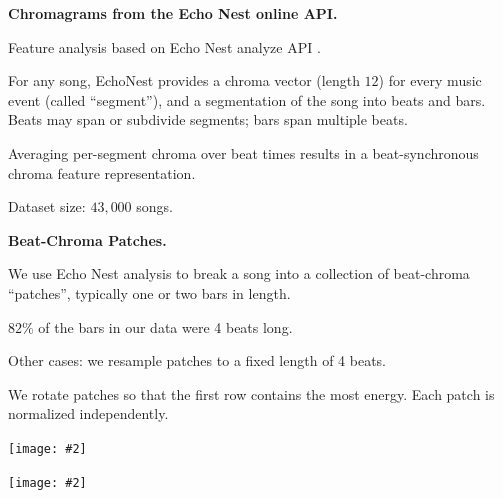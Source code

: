 \documentclass[portrait,a0b,final]{a0poster}
\newenvironment{poster}{
  \begin{center}
  \begin{minipage}[c]{0.98\textwidth}
}{
  \end{minipage} 
  \end{center}
}
\newcommand{\pbox}[4]{
\psshadowbox[#3]{
\begin{minipage}[t][#2][t]{#1}
#4
\end{minipage}
}}
\newcommand{\myfig}[3][0]{
\begin{center}
  \vspace{1.5cm}
  \texttt{[image: \#2]}
  \nobreak\medskip
\end{center}}
\newcommand{\mycaption}[1]{
  \vspace{0.5cm}
  \begin{quote}
    {{\sc Figure} \arabic{figure}: #1}
  \end{quote}
  \vspace{1cm}
  \stepcounter{figure}
}
\begin{document}
\begin{poster}
\begin{multicols}{3}
\vspace{1.0cm}

\textbf{Chromagrams from the Echo Nest online API.}
\begin{list}{}{\leftmargin=2em =1em}
\item Feature analysis based on Echo Nest analyze API \cite{EchoNest}.
\item For any song, EchoNest provides a chroma
vector (length $12$) for every music event (called ``segment''), and a
segmentation of the song into beats and bars. Beats may span or 
subdivide segments; bars span multiple beats.
\item Averaging per-segment chroma over beat times results in a
beat-synchronous chroma feature representation.
\item Dataset size: $43,000$ songs.
\end{list}

\textbf{Beat-Chroma Patches.}
\begin{list}{}{\leftmargin=2em =1em}
\item We use Echo Nest analysis to break a song into a collection of 
beat-chroma ``patches'', typically one or two bars in length.
\item $82\%$ of the bars in our data were 4 beats long.
\item Other cases: we resample patches to a fixed length of 4 beats.
\item We rotate patches so that the first row contains the most energy.
Each patch is normalized independently.
\end{list}



\myfig[0]{song_encoded.ps}{.9}

\myfig[0]{codes_8bars.ps}{.8}

\newpage


\vspace{2cm}
\begin{center}
  \pbox{0.8\columnwidth}{}{linewidth=2mm,framearc=0.1,linecolor=lightred,fillstyle=gradient,gradangle=0,gradbegin=white,gradend=whitepink,gradmidpoint=1.0,framesep=1em}{
    \begin{center}
      \large Vector Quantization
    \end{center}}
\end{center}


\end{multicols}
\end{poster}
\end{document}

